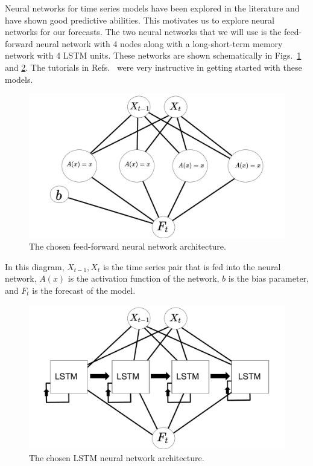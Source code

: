 \documentclass[10pt,a4paper]{article}
\begin{document}
Neural networks for time series models have been explored in the literature  \cite{Adhikari_2013,Oancea_2014,Chaudhuri_2016} and have shown good predictive abilities. This motivates us to explore neural networks for our forecasts. The two neural networks that we will use is the feed-forward neural network with 4 nodes along with a long-short-term memory network with 4 LSTM units. These networks are shown schematically in Figs.~\ref{fig:FFNN architecture} and \ref{fig:LSTM architecture}. The tutorials in Refs.~\cite{Acatay_2017,Pant_2018,Vincent_2018} were very instructive in getting started with these models.
\begin{figure}[h]
\begin{center}
\includegraphics[scale=0.4]{Neural_net_schematic_FFNN.pdf}
\caption{The chosen feed-forward neural network architecture.}
\label{fig:FFNN architecture}
\centering
\end{center}
\end{figure}
In this diagram, ${X_{t-1},X_{t}}$ is the time series pair that is fed into the neural network, $A(x)$ is the activation function of the network, $b$ is the bias parameter, and $F_{t}$ is the forecast of the model.
\begin{figure}[h]
\begin{center}
\includegraphics[scale=0.4]{Neural_net_schematic_LSTM.pdf}
\caption{The chosen LSTM neural network architecture.}
\label{fig:LSTM architecture}
\centering
\end{center}
\end{figure}
\end{document}
